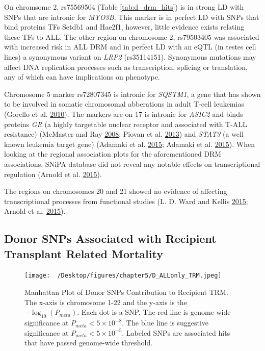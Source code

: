 \documentclass[]{DissertateOSU}
\begin{document}
On chromsome 2, rs75569504 (Table \ref{tab:d_drm_hits}) is in strong LD
with SNPs that are intronic for \emph{MYO3B}. This marker is in perfect
LD with SNPs that bind proteins TFs Setdb1 and Hae2f1, however, little
evidence exists relating these TFs to ALL. The other region on
chromosome 2, rs79503405 was associated with increased risk in ALL DRM
and in perfect LD with an eQTL (in testes cell lines) a synonymous
variant on \emph{LRP2} (rs35114151). Synonymous mutations may affect DNA
replication processes such as transcription, splicing or translation,
any of which can have implications on phenotype.

Chromosome 5 marker rs72807345 is intronic for \emph{SQSTM1}, a gene
that has shown to be involved in somatic chromosomal abberations in
adult T-cell leukemias (Gorello et al.
\protect\hyperlink{ref-gorello_2010}{2010}). The markers are on 17 is
intronic for \emph{ASIC2} and binds proteins \emph{GR} (a highly
targetable nuclear receptor and associated with T-ALL resistance)
(McMaster and Ray \protect\hyperlink{ref-McMaster_2008}{2008}; Piovan et
al. \protect\hyperlink{ref-Piovan_2013}{2013}) and \emph{STAT3} (a well
known leukemia target gene) (Adamaki et al.
\protect\hyperlink{ref-Adamaki_2015}{2015}; Adamaki et al.
\protect\hyperlink{ref-Adamaki_2015}{2015}). When looking at the
regional association plots for the aforementioned DRM associations,
SNiPA database did not reveal any notable effects on transcriptional
regulation (Arnold et al. \protect\hyperlink{ref-snipa}{2015}).

The regions on chromosomes 20 and 21 showed no evidence of affecting
transcriptional processes from functional studies (L. D. Ward and Kellis
\protect\hyperlink{ref-haploreg}{2015}; Arnold et al.
\protect\hyperlink{ref-snipa}{2015}).

\subsection{Donor SNPs Associated with Recipient Transplant Related
Mortality}\label{donor-snps-associated-with-recipient-transplant-related-mortality}

\begin{figure}
    \centering
    \texttt{[image: ~/Desktop/figures/chapter5/D\_ALLonly\_TRM.jpeg]}
    \caption[Manhattan Plot of Donor SNPs Contribution to Recipient TRM]{Manhattan Plot of Donor SNPs Contribution to Recipient TRM. The x-axis is chromosome 1-22 and the y-axis is the $-\log_{10}(P_{meta})$. Each dot is a SNP. The red line is genome wide significance at $P_{meta} < 5\times{10}^{-8}$. The blue line is suggestive significance at $P_{meta} <  5\times{10}^{-5}$. Labeled SNPs are associated hits that have passed genome-wide threshold.}
    \label{fig:d_trm_1y}  
\end{figure}
\end{document}
